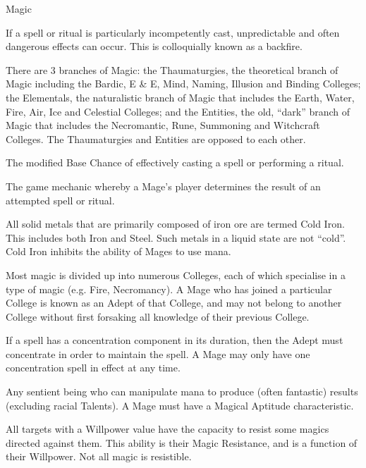 \begin{Chapter}{Magic}
\begin{Description}
\item[Backfire] If a spell or ritual is particularly incompetently
  cast, unpredictable and often dangerous effects can occur.  This is
  colloquially known as a backfire.

\item[Branches of Magic] There are 3 branches of Magic: the
  Thaumaturgies, the theoretical branch of Magic including the Bardic,
  E \& E, Mind, Naming, Illusion and Binding Colleges; the Elementals,
  the naturalistic branch of Magic that includes the Earth, Water,
  Fire, Air, Ice and Celestial Colleges; and the Entities, the old,
  “dark” branch of Magic that includes the Necromantic, Rune,
  Summoning and Witchcraft Colleges.  The Thaumaturgies and Entities
  are opposed to each other.

\item[Cast Chance] The modified Base Chance of effectively casting a
  spell or performing a ritual.

\item[Cast Check] The game mechanic whereby a Mage’s player determines
  the result of an attempted spell or ritual.

\item[Cold Iron] All solid metals that are primarily composed of iron
  ore are termed Cold Iron.  This includes both Iron and Steel. Such
  metals in a liquid state are not “cold”. Cold Iron inhibits the
  ability of Mages to use mana.

\item[College ] Most magic is divided up into numerous Colleges, each
  of which specialise in a type of magic (e.g.  Fire, Necromancy).  A
  Mage who has joined a particular College is known as an Adept of
  that College, and may not belong to another College without first
  forsaking all knowledge of their previous College.

\item[Concentration] If a spell has a concentration component in its
  duration, then the Adept must concentrate in order to maintain the
  spell.  A Mage may only have one concentration spell in effect at
  any time.

\item[Mage] Any sentient being who can manipulate mana to produce
  (often fantastic) results (excluding racial Talents). A Mage must
  have a Magical Aptitude characteristic.

\item[Magic Resistance] All targets with a Willpower value have the
  capacity to resist some magics directed against them.  This ability
  is their Magic Resistance, and is a function of their Willpower.
  Not all magic is resistible.


\end{Description}
\end{Chapter}
